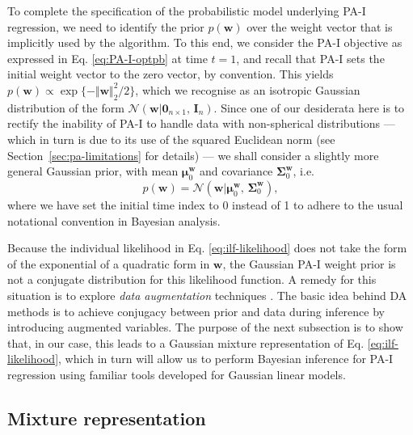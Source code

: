 To complete the specification of the probabilistic model underlying PA-I regression, we need to identify the prior $p(\mathbf{w})$ over the weight vector that is implicitly used by the algorithm. To this end, we consider the PA-I objective as expressed in Eq. \eqref{eq:PA-I-optpb} at time $t=1$, and recall that PA-I sets the initial weight vector to the zero vector, by convention. This yields $p(\mathbf{w}) \propto \exp\{-\Vert\mathbf{w}\Vert_2^2/2\}$, which we recognise as an isotropic Gaussian distribution of the form $\mathcal{N}(\mathbf{w}|\mathbf{0}_{n\times 1}, \, \mathbf{I}_{n})$. Since one of our desiderata here is to rectify the inability of PA-I to handle data with non-spherical distributions --- which in turn is due to its use of the squared Euclidean norm (see Section~\ref{sec:pa-limitations} for details) --- we shall consider a slightly more general Gaussian prior, with mean $\boldsymbol{\mu}_{0}^{\mathbf{w}}$ and covariance $\boldsymbol{\Sigma}_{0}^{\mathbf{w}}$, i.e.\
\begin{equation}
\label{eq:PA-I-prior}
	p(\mathbf{w})
	= \mathcal{N}(\mathbf{w}|\boldsymbol{\mu}_{0}^{\mathbf{w}},\,\boldsymbol{\Sigma}_{0}^{\mathbf{w}}),
\end{equation}
where we have set the initial time index to 0 instead of 1 to adhere to the usual notational convention in Bayesian analysis.

Because the individual likelihood in Eq. \eqref{eq:ilf-likelihood} does not take the form of the exponential of a quadratic form in $\mathbf{w}$, the Gaussian PA-I weight prior is not a conjugate distribution for this likelihood function. A remedy for this situation is to explore \emph{data augmentation} techniques \citep{tanner87, polson&scott}. The basic idea behind DA methods is to achieve conjugacy between prior and data during inference by introducing augmented variables.
The purpose of the next subsection is to show that, in our case, this leads to a Gaussian mixture representation of Eq. \eqref{eq:ilf-likelihood}, which in turn will allow us to perform Bayesian inference for PA-I regression using familiar tools developed for Gaussian linear models.

\subsection{Mixture representation}

